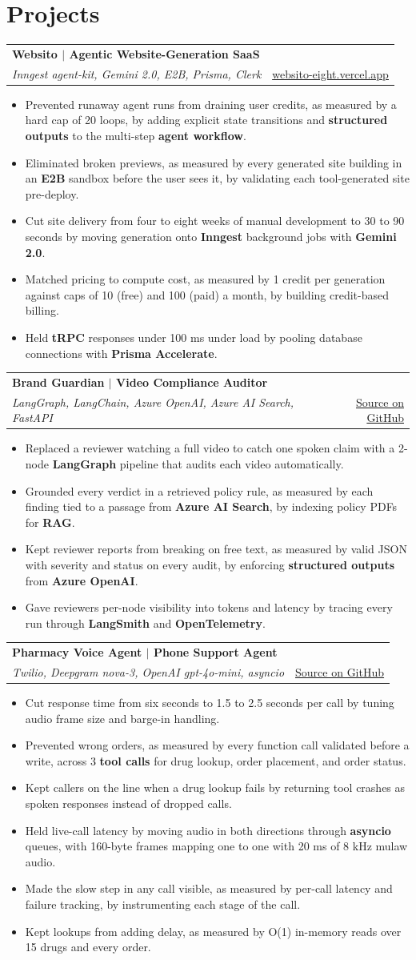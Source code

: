 \documentclass[letterpaper,10pt]{article}
\makeatletter
\newcommand{\bi}[1]{\item{\small #1}}
\newcommand{\row}[4]{\begin{tabular*}{\textwidth}[t]{l@{\extracolsep{\fill}}r}
\textbf{#1} & \small #2 \\ \textit{\small #3} & \small #4 \\ \end{tabular*}\vspace{0pt}}
\newcommand{\bstart}{\begin{itemize}[leftmargin=0.16in,itemsep=0.8pt,parsep=0pt,topsep=1pt,label=\textbullet]}
\newcommand{\bend}{\end{itemize}\vspace{1pt}}
\makeatother
\begin{document}
\section{Projects}

\row{Websito $|$ Agentic Website-Generation SaaS}{}{Inngest agent-kit, Gemini 2.0, E2B, Prisma, Clerk}{\href{https://websito-eight.vercel.app/}{\underline{websito-eight.vercel.app}}}
\bstart
\bi{Prevented runaway agent runs from draining user credits, as measured by a hard cap of 20 loops, by adding explicit state transitions and \textbf{structured outputs} to the multi-step \textbf{agent workflow}.}
\bi{Eliminated broken previews, as measured by every generated site building in an \textbf{E2B} sandbox before the user sees it, by validating each tool-generated site pre-deploy.}
\bi{Cut site delivery from four to eight weeks of manual development to 30 to 90 seconds by moving generation onto \textbf{Inngest} background jobs with \textbf{Gemini 2.0}.}
\bi{Matched pricing to compute cost, as measured by 1 credit per generation against caps of 10 (free) and 100 (paid) a month, by building credit-based billing.}
\bi{Held \textbf{tRPC} responses under 100 ms under load by pooling database connections with \textbf{Prisma Accelerate}.}
\bend

\row{Brand Guardian $|$ Video Compliance Auditor}{}{LangGraph, LangChain, Azure OpenAI, Azure AI Search, FastAPI}{\href{https://github.com/HarshaVardhanRobba/Brand_guardian}{\underline{Source on GitHub}}}
\bstart
\bi{Replaced a reviewer watching a full video to catch one spoken claim with a 2-node \textbf{LangGraph} pipeline that audits each video automatically.}
\bi{Grounded every verdict in a retrieved policy rule, as measured by each finding tied to a passage from \textbf{Azure AI Search}, by indexing policy PDFs for \textbf{RAG}.}
\bi{Kept reviewer reports from breaking on free text, as measured by valid JSON with severity and status on every audit, by enforcing \textbf{structured outputs} from \textbf{Azure OpenAI}.}
\bi{Gave reviewers per-node visibility into tokens and latency by tracing every run through \textbf{LangSmith} and \textbf{OpenTelemetry}.}
\bend

\row{Pharmacy Voice Agent $|$ Phone Support Agent}{}{Twilio, Deepgram nova-3, OpenAI gpt-4o-mini, asyncio}{\href{https://github.com/HarshaVardhanRobba/Voice-Agent}{\underline{Source on GitHub}}}
\bstart
\bi{Cut response time from six seconds to 1.5 to 2.5 seconds per call by tuning audio frame size and barge-in handling.}
\bi{Prevented wrong orders, as measured by every function call validated before a write, across 3 \textbf{tool calls} for drug lookup, order placement, and order status.}
\bi{Kept callers on the line when a drug lookup fails by returning tool crashes as spoken responses instead of dropped calls.}
\bi{Held live-call latency by moving audio in both directions through \textbf{asyncio} queues, with 160-byte frames mapping one to one with 20 ms of 8 kHz mulaw audio.}
\bi{Made the slow step in any call visible, as measured by per-call latency and failure tracking, by instrumenting each stage of the call.}
\bi{Kept lookups from adding delay, as measured by O(1) in-memory reads over 15 drugs and every order.}
\bend
\end{document}
